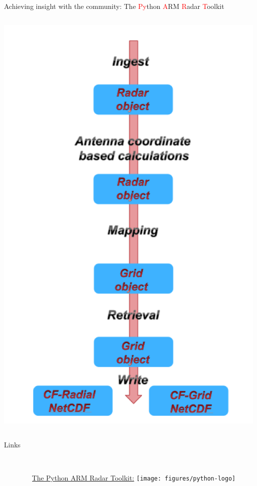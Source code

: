\documentclass[final]{beamer}
\begin{document}
\begin{frame}{}
\begin{columns}[t]
\begin{column}{.3\linewidth}
\begin{block}{Achieving insight with the community: The \textcolor{red}{Py}thon \textcolor{red}{A}RM \textcolor{red}{R}adar \textcolor{red}{T}oolkit}
\begin{columns}[t]
\begin{column}{.45\linewidth}
                       \includegraphics[width=0.9\linewidth]{figures/pyart-flow}\\[1ex]   
                   \end{column}
               \end{columns}
                       \end{block}
        
         \begin{block}{Links}
         	\begin{columns}[c]
	\begin{column}{.02\linewidth}
	\end{column}
         		\begin{column}{.28\linewidth}
		   		\\
         			
         			{\small \hyperlink{http://arm-doe.github.io/pyart/}{The Python ARM Radar Toolkit:}} 
			        \texttt{[image: figures/python-logo]}\\[1ex]   


\end{column}
\end{columns}
\end{block}
\end{column}
\end{columns}
\end{frame}
\end{document}

